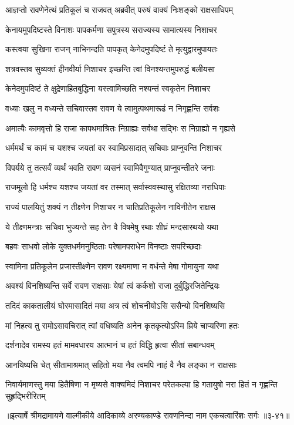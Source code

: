 
\twolineshloka
{आज्ञप्तो रावणेनेत्थं प्रतिकूलं च राजवत्}
{अब्रवीत् परुषं वाक्यं निःशङ्को राक्षसाधिपम्} %

\twolineshloka
{केनायमुपदिष्टस्ते विनाशः पापकर्मणा}
{सपुत्रस्य सराज्यस्य सामात्यस्य निशाचर} %

\twolineshloka
{कस्त्वया सुखिना राजन् नाभिनन्दति पापकृत्}
{केनेदमुपदिष्टं ते मृत्युद्वारमुपायतः} %

\twolineshloka
{शत्रवस्तव सुव्यक्तं हीनवीर्या निशाचर}
{इच्छन्ति त्वां विनश्यन्तमुपरुद्धं बलीयसा} %

\twolineshloka
{केनेदमुपदिष्टं ते क्षुद्रेणाहितबुद्धिना}
{यस्त्वामिच्छति नश्यन्तं स्वकृतेन निशाचर} %

\twolineshloka
{वध्याः खलु न वध्यन्ते सचिवास्तव रावण}
{ये त्वामुत्पथमारूढं न निगृह्णन्ति सर्वशः} %

\twolineshloka
{अमात्यैः कामवृत्तो हि राजा कापथमाश्रितः}
{निग्राह्यः सर्वथा सद्भिः स निग्राह्यो न गृह्यसे} %

\twolineshloka
{धर्ममर्थं च कामं च यशश्च जयतां वर}
{स्वामिप्रसादात् सचिवाः प्राप्नुवन्ति निशाचर} %

\twolineshloka
{विपर्यये तु तत्सर्वं व्यर्थं भवति रावण}
{व्यसनं स्वामिवैगुण्यात् प्राप्नुवन्तीतरे जनाः} %

\twolineshloka
{राजमूलो हि धर्मश्च यशश्च जयतां वर}
{तस्मात् सर्वास्ववस्थासु रक्षितव्या नराधिपाः} %

\twolineshloka
{राज्यं पालयितुं शक्यं न तीक्ष्णेन निशाचर}
{न चातिप्रतिकूलेन नाविनीतेन राक्षस} %

\twolineshloka
{ये तीक्ष्णमन्त्राः सचिवा भुज्यन्ते सह तेन वै}
{विषमेषु रथाः शीघ्रं मन्दसारथयो यथा} %

\twolineshloka
{बहवः साधवो लोके युक्तधर्ममनुष्ठिताः}
{परेषामपराधेन विनष्टाः सपरिच्छदाः} %

\twolineshloka
{स्वामिना प्रतिकूलेन प्रजास्तीक्ष्णेन रावण}
{रक्ष्यमाणा न वर्धन्ते मेषा गोमायुना यथा} %

\twolineshloka
{अवश्यं विनशिष्यन्ति सर्वे रावण राक्षसाः}
{येषां त्वं कर्कशो राजा दुर्बुद्धिरजितेन्द्रियः} %

\twolineshloka
{तदिदं काकतालीयं घोरमासादितं मया}
{अत्र त्वं शोचनीयोऽसि ससैन्यो विनशिष्यसि} %

\twolineshloka
{मां निहत्य तु रामोऽसावचिरात् त्वां वधिष्यति}
{अनेन कृतकृत्योऽस्मि म्रिये चाप्यरिणा हतः} %

\twolineshloka
{दर्शनादेव रामस्य हतं मामवधारय}
{आत्मानं च हतं विद्धि हृत्वा सीतां सबान्धवम्} %

\twolineshloka
{आनयिष्यसि चेत् सीतामाश्रमात् सहितो मया}
{नैव त्वमपि नाहं वै नैव लङ्का न राक्षसाः} %

\twolineshloka
{निवार्यमाणस्तु मया हितैषिणा न मृष्यसे वाक्यमिदं निशाचर}
{परेतकल्पा हि गतायुषो नरा हितं न गृह्णन्ति सुहृद्भिरीरितम्} %


॥इत्यार्षे श्रीमद्रामायणे वाल्मीकीये आदिकाव्ये अरण्यकाण्डे रावणनिन्दा नाम एकचत्वारिंशः सर्गः ॥३-४१॥
